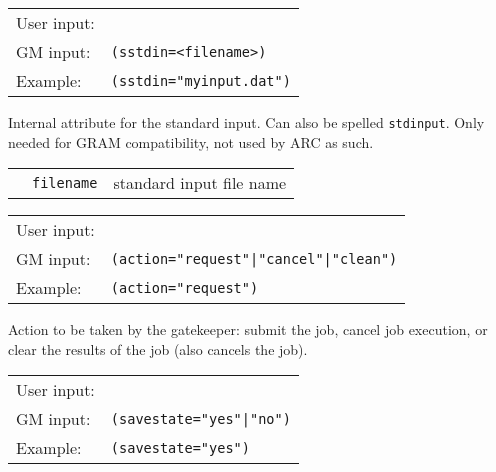   \hspace*{0.5cm}
  \begin{shaded}
  \end{shaded}
  \begin{tabular}{lp{13cm}}
    User input:&\verb##\\
    GM input:&\verb#(sstdin=<filename>)#\\
    Example:&\verb#(sstdin="myinput.dat")#\\
  \end{tabular}

  Internal attribute for the standard input. Can also be spelled \texttt{stdinput}.
  Only needed for GRAM compatibility, not used by ARC as such.

  \begin{tabular}{llp{10cm}}
    \hspace*{1cm}&\texttt{filename} & standard input file name\\
  \end{tabular}

  \hspace*{0.5cm}
  \begin{shaded}
  \end{shaded}
  \begin{tabular}{lp{13cm}}
    User input:&\verb##\\
    GM input:&\verb#(action="request"|"cancel"|"clean")#\\
    Example:&\verb#(action="request")#\\
  \end{tabular}

  Action to be taken by the gatekeeper: submit the job, cancel job
  execution, or clear the results of the job (also cancels the job).

  \hspace*{0.5cm}
  \begin{shaded}
  \end{shaded}
  \begin{tabular}{lp{13cm}}
    User input:&\verb##\\
    GM input:&\verb#(savestate="yes"|"no")#\\
    Example:&\verb#(savestate="yes")#\\
  \end{tabular}

